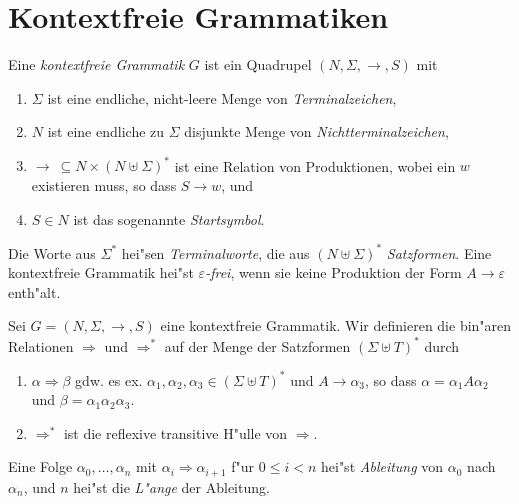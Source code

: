 \documentclass[12pt,a4paper]{article}
\begin{document}
\section{Kontextfreie Grammatiken}

Eine \emph{kontextfreie Grammatik} $G$ ist ein Quadrupel $(N,\Sigma,\to,S)$ mit
\begin{enumerate}
\item $\Sigma$ ist eine endliche, nicht-leere Menge von \emph{Terminalzeichen},
\item $N$ ist eine endliche zu $\Sigma$ disjunkte Menge von \emph{Nichtterminalzeichen},
\item $\to\ \subseteq N \times (N \uplus \Sigma)^*$ ist eine Relation von Produktionen, wobei ein $w$ existieren
  muss, so dass $S \to w$, und
\item $S \in N$ ist das sogenannte \emph{Startsymbol}.
\end{enumerate}
Die Worte aus $\Sigma^*$ hei"sen \emph{Terminalworte}, die aus $(N \uplus \Sigma)^*$ \emph{Satzformen}. Eine
kontextfreie Grammatik hei"st \emph{$\varepsilon$-frei}, wenn sie keine Produktion der Form
$A \to \varepsilon$ enth"alt.

\begin{definition}[Ableitungen]
  Sei $G=(N,\Sigma,\to,S)$ eine kontextfreie Grammatik. Wir definieren die bin"aren Relationen $\Rightarrow$
  und $\Rightarrow^*$ auf der Menge der Satzformen $(\Sigma \uplus T)^*$ durch
  \begin{enumerate}
  \item $\alpha \Rightarrow \beta$ gdw. es ex. $\alpha_1,\alpha_2,\alpha_3\in (\Sigma \uplus T)^*$ und
    $A \to \alpha_3$, so dass $\alpha = \alpha_1 A \alpha_2$ und $\beta = \alpha_1\alpha_2\alpha_3$.
  \item $\Rightarrow^*$ ist die reflexive transitive H"ulle von $\Rightarrow$.
  \end{enumerate}
  Eine Folge $\alpha_0,\ldots,\alpha_n$ mit $\alpha_i \Rightarrow \alpha_{i+1}$ f"ur $0 \le i < n$ hei"st
  \emph{Ableitung} von $\alpha_0$ nach $\alpha_n$, und $n$ hei"st die \emph{L"ange} der Ableitung.
\end{definition}
\end{document}
